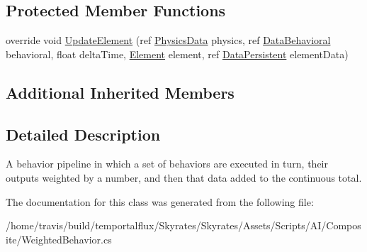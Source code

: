 \subsection*{Protected Member Functions}
\begin{DoxyCompactItemize}
\item 
\hypertarget{class_skyrates_1_1_a_i_1_1_composite_1_1_weighted_behavior_a25b17a8ef13127b5dfea6c7399b131bb}{override void \hyperlink{class_skyrates_1_1_a_i_1_1_composite_1_1_weighted_behavior_a25b17a8ef13127b5dfea6c7399b131bb}{Update\-Element} (ref \hyperlink{class_skyrates_1_1_physics_1_1_physics_data}{Physics\-Data} physics, ref \hyperlink{class_skyrates_1_1_a_i_1_1_behavior_1_1_data_behavioral}{Data\-Behavioral} behavioral, float delta\-Time, \hyperlink{class_skyrates_1_1_a_i_1_1_composite_1_1_weighted_behavior_1_1_element}{Element} element, ref \hyperlink{class_skyrates_1_1_a_i_1_1_behavior_1_1_data_persistent}{Data\-Persistent} element\-Data)}\label{class_skyrates_1_1_a_i_1_1_composite_1_1_weighted_behavior_a25b17a8ef13127b5dfea6c7399b131bb}

\end{DoxyCompactItemize}
\subsection*{Additional Inherited Members}


\subsection{Detailed Description}
A behavior pipeline in which a set of behaviors are executed in turn, their outputs weighted by a number, and then that data added to the continuous total. 



The documentation for this class was generated from the following file\-:\begin{DoxyCompactItemize}
\item 
/home/travis/build/temportalflux/\-Skyrates/\-Skyrates/\-Assets/\-Scripts/\-A\-I/\-Composite/Weighted\-Behavior.\-cs\end{DoxyCompactItemize}
